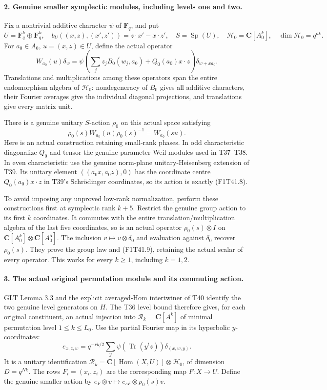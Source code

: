 \paragraph{2. Genuine smaller symplectic modules, including levels one and two.}
Fix a nontrivial additive character \(\psi\) of
\(\mathbf F_q\), and put
\[
 U=\mathbf F_q^k\oplus\mathbf F_q^k,
 \quad b_U((x,z),(x',z'))=z\cdot x'-x\cdot z',
 \quad S=\operatorname{Sp}(U),\quad
 \mathcal H_0=\mathbf C[A_0^k],\quad\dim\mathcal H_0=q^{ak}.
 \tag{F1T41.7}
\]
For \(a_0\in A_0\), \(u=(x,z)\in U\), define
the actual operator
\[
 W_{a_0}(u)\delta_w=
 \psi\!\left(\sum_j z_j B_0(w_j,a_0)
                        +Q_0(a_0)x\cdot z\right)
                      \delta_{w+x a_0}.
 \tag{F1T41.8}
\]
Translations and multiplications among these operators
span the entire endomorphism algebra of \(\mathcal H_0\):
nondegeneracy of \(B_0\) gives all additive characters,
their Fourier averages give the individual diagonal
projections, and translations give every matrix unit.

There is a genuine unitary \(S\)-action \(\rho_0\) on
this actual space satisfying
\[
       \rho_0(s)W_{a_0}(u)\rho_0(s)^{-1}=W_{a_0}(su).
 \tag{F1T41.9}
\]
Here is an actual construction retaining small-rank phases.
In odd characteristic diagonalize \(Q_0\) and tensor
the genuine parameter Weil modules used in T37--T38.
In even characteristic use the genuine norm-plane
unitary-Heisenberg extension of T39. Its unitary element
\(((a_0x,a_0z),0)\) has the coordinate centre
\(Q_0(a_0)x\cdot z\) in T39's Schr\"odinger coordinates,
so its action is exactly (F1T41.8).

To avoid imposing any unproved low-rank normalization,
perform these constructions first at symplectic rank
\(k+5\). Restrict the genuine group action to its
first \(k\) coordinates. It commutes with the entire
translation/multiplication algebra of the last five
coordinates, so is an actual operator
\(\rho_0(s)\otimes I\) on
\(\mathbf C[A_0^k]\otimes\mathbf C[A_0^5]\).
The inclusion \(v\mapsto v\otimes\delta_0\) and
evaluation against \(\delta_0\) recover \(\rho_0(s)\).
They prove the group law and (F1T41.9), retaining the
actual scalar of every operator. This works for every
\(k\ge1\), including \(k=1,2\).

\paragraph{3. The actual original permutation module and its commuting action.}
GLT Lemma 3.3 and the explicit averaged-Hom intertwiner
of T40 identify the two genuine level generators on
\(H\). The T36 level bound therefore gives, for each
original constituent, an actual injection into
\(\mathcal R_k=\mathbf C[A^k]\) of minimal permutation
level \(1\le k\le L_0\). Use the partial Fourier map
in its hyperbolic \(y\)-coordinates:
\[
 e_{x,z,w}=q^{-rk/2}\sum_y\psi(\operatorname{Tr}(y^tz))
                                      \delta_{(x,w,y)}.
 \tag{F1T41.10}
\]
It is a unitary identification
\(\mathcal R_k=\mathbf C[\operatorname{Hom}(X,U)]
\otimes\mathcal H_0\), of dimension \(D=q^{Nk}\).
The rows \(F_i=(x_i,z_i)\) are the corresponding
map \(F:X\to U\). Define the genuine smaller action
by \(e_F\otimes v\mapsto e_{sF}\otimes\rho_0(s)v\).

